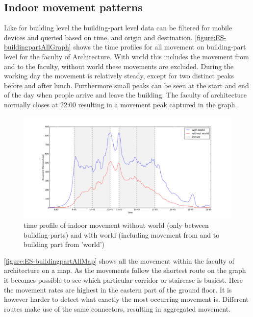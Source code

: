 \subsection{Indoor movement patterns}\label{ES-indoorMovement}
Like for building level the building-part level data can be filtered for mobile devices and queried based on time, and origin and destination. \autoref{figure:ES-buildingpartAllGraph} shows the time profiles for all movement on building-part level for the faculty of Architecture. With world this includes the movement from and to the faculty, without world these movements are excluded. During the working day the movement is relatively steady, except for two distinct peaks before and after lunch. Furthermore small peaks can be seen at the start and end of the day when people arrive and leave the building. The faculty of architecture normally closes at 22:00 resulting in a movement peak captured in the graph. 

\begin{figure}[H]
\centering
\includegraphics[scale=0.2]{buildingpart_all_graph.png}
\captionsetup{justification=centering}
\caption{time profile of indoor movement without world (only between building-parts) and with world (including movement from and to building part from 'world')}
\label{figure:ES-buildingpartAllGraph}
\end{figure}

\autoref{figure:ES-buildingpartAllMap} shows all the movement within the faculty of architecture on a map. As the movements follow the shortest route on the graph it becomes possible to see which particular corridor or staircase is busiest. Here the movement rates are highest in the eastern part of the ground floor. It is however harder to detect what exactly the most occurring movement is. Different routes make use of the same connectors, resulting in aggregated movement.


